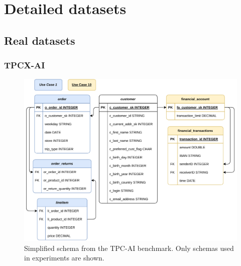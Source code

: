 \chapter{Detailed datasets}


\section{Real datasets}
\subsection{TPCX-AI}

\begin{figure}
    \centering
    \includegraphics[width=0.99\linewidth]{appendices/figures/tpc-ai-schema.pdf}
    \caption{Simplified schema from the TPC-AI \cite{tpcx_ai} benchmark. Only schemas used in experiments are shown.}
    \label{fig:appendix-tpc-ai-schema}
\end{figure}
